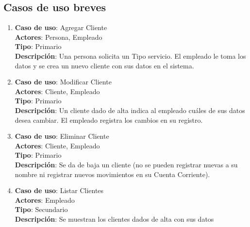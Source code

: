\documentclass[12pt]{extarticle}
\begin{document}
\begin{spacing}{1.2}
    \clearpage

    \subsection{Casos de uso breves}


    \begin{enumerate}



        \subsubsection{Clientes}



        \item 	\textbf{Caso de uso}: Agregar Cliente\\
                \textbf{Actores}: Persona, Empleado\\
                \textbf{Tipo}: Primario\\
                \textbf{Descripción}: Una persona solicita un Tipo servicio. El empleado le toma los datos y se crea un nuevo cliente con sus datos en el sistema.

        \item 	\textbf{Caso de uso}: Modificar Cliente\\
                \textbf{Actores}: Cliente, Empleado\\
                \textbf{Tipo}: Primario\\
                \textbf{Descripción}: Un cliente dado de alta indica al empleado cuáles de sus datos desea cambiar. El empleado registra los cambios en su registro.

        \item 	\textbf{Caso de uso}: Eliminar Cliente\\
                \textbf{Actores}: Cliente, Empleado\\
                \textbf{Tipo}: Primario\\
                \textbf{Descripción}: Se da de baja un cliente (no se pueden registrar nuevas \OTs{} a su nombre ni registrar nuevos movimientos en su Cuenta Corriente).

        \item 	\textbf{Caso de uso}: Listar Clientes\\
                \textbf{Actores}: Empleado\\
                \textbf{Tipo}: Secundario\\
                \textbf{Descripción}: Se muestran los clientes dados de alta con sus datos


\end{enumerate}
\end{spacing}
\end{document}
